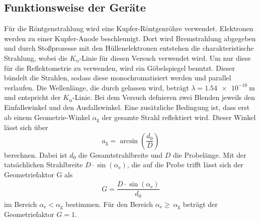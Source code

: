 \subsection{Funktionsweise der Geräte}
\label{sec:Geräte}
Für die Röntgenstrahlung wird eine Kupfer-Röntgenröhre verwendet. Elektronen werden zu einer Kupfer-Anode beschleunigt. Dort wird Bremstrahlung abgegeben und durch Stoßprozesse mit den Hüllenelektronen entstehen die charakteristische Strahlung, wobei die $K_\mathrm{\alpha}$-Linie für diesen Versuch verwendet wird. Um nur diese für die Reflektometrie zu verwenden, wird ein Göbelspiegel benutzt. Dieser bündelt die Strahlen, sodass diese monochromatisiert werden und parallel verlaufen. Die Wellenlänge, die durch gelassen wird, beträgt $\lambda=\SI{1.54 e-10}{\meter}$ und entspricht der $K_\mathrm{\alpha}$-Linie.
Bei dem Versuch defnieren zwei Blenden jeweils den Einfallswinkel und den Ausfallswinkel. Eine zusätzliche Bedingung ist, dass erst ab einem Geometrie-Winkel $\alpha_\mathrm{g}$ der gesamte Strahl reflektiert wird. Dieser Winkel lässt sich über
\begin{equation}
  \label{eqn:Geometriewinkel}
a_\mathrm{g}=\arcsin\left(\dfrac{d_\mathrm{0}}{D}\right)
\end{equation}
berechnen. Dabei ist $d_\mathrm{0}$ die Gesamtstrahlbreite und $D$ die Probelänge. Mit der tatsächlichen Strahlbreite $D\cdot\sin(\alpha_\mathrm{e})$, die auf die Probe trifft lässt sich der Geometriefaktor G als
\begin{align}
  \label{eqn:Geometriefaktorl}
G= \dfrac{D\cdot\sin(\alpha_\mathrm{e})}{d_\mathrm{0}}
\end{align}
im Bereich $ \alpha_\mathrm{e}< \alpha_\mathrm{g}$ bestimmen. Für den Bereich $\alpha_\mathrm{e}\geq\ \alpha_\mathrm{g}$ beträgt der Geometriefaktor $G=1$.
